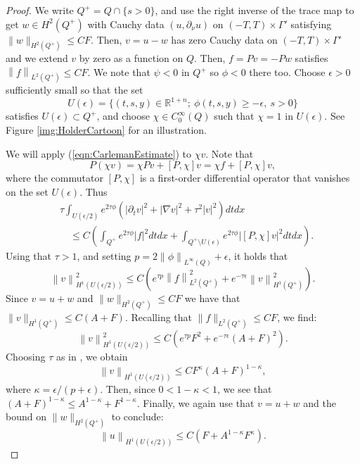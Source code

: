 \documentclass[final,leqno]{siamart1116}
\begin{document}
\begin{proof}
We write $Q^+ = Q \cap \{ s > 0\}$, and use the right inverse of the
trace map to get $w \in H^2(Q^+)$ with Cauchy data $(u, {\partial}_\nu u)$ on
$(-T,T) \times \Gamma'$ satisfying $\|w\|_{H^2(Q^+)} \leq C F$. Then,
$v = u-w$ has zero Cauchy data on $(-T,T) \times \Gamma'$ and we
extend $v$ by zero as a function on $Q$. Then, $f = Pv = -Pw$ satisfies
${\left\|{f} \right\|}_{L^2(Q^+)} \le C F$. We note that $\psi < 0$ in $Q^+$ so $\phi
< 0$ there too. Choose $\epsilon > 0$ sufficiently small so that the
set
\begin{equation*}
  U(\epsilon) = \{(t,s,y) \in {\mathbb{R}}^{1+n};\ \phi(t,s,y) \ge -\epsilon,\ s > 0 \}
\end{equation*}
satisfies $U(\epsilon) \subset Q^+ $, and choose $\chi \in
C_0^\infty(Q)$ such that $\chi = 1$ in $U(\epsilon)$.  See Figure
\ref{img:HolderCartoon} for an illustration.

We will apply (\ref{eqn:CarlemanEstimate}) to $\chi v$. Note that 
\begin{equation*}
  P(\chi v) = \chi Pv + [P,\chi]v = \chi f + [P,\chi]v,
\end{equation*}
where the commutator $[P,\chi]$ is a first-order differential operator
that vanishes on the set $U(\epsilon)$.
Thus
\begin{align*}
  &\tau \int_{U(\epsilon/2)} e^{2 \tau \phi} \left(|{\partial}_t v|^2 + |\nabla v|^2 + \tau^2 |v|^2\right) dt dx \\ 
  &\quad \le C \left(\int_{Q^+} e^{2 \tau \phi} |f|^2 dt dx 
  + \int_{Q^+ \setminus U(\epsilon)} e^{2 \tau\phi} |[P,\chi]v|^2 dt dx\right).
\end{align*}
Using that $\tau > 1$, and setting $p = 2{\left\|{\phi} \right\|}_{L^\infty(Q)} +
\epsilon$, it holds that
\begin{equation*}
  {\left\|{v} \right\|}_{H^1(U(\epsilon / 2))}^2 \le C \left(e^{\tau p}{\left\|{f} \right\|}_{L^2(Q^+)}^2 + e^{-\tau \epsilon}{\left\|{v} \right\|}_{H^1(Q^+)}^2\right).
\end{equation*}
Since $v = u + w$ and $\|w\|_{H^2(Q^+)} \leq CF$ we have that
$\|v\|_{H^1(Q^+)} \leq C(A + F)$. Recalling that $\|f\|_{L^2(Q^+)}
\leq CF$, we find:
\begin{equation*}
  {\left\|{v} \right\|}_{H^1(U(\epsilon / 2))}^2 \le C \left(e^{\tau p}F^2 +
  e^{-\tau \epsilon}(A+F)^2\right).
\end{equation*}
Choosing $\tau$ as in
\cite[Thm. 3.2.2]{Isakov2010}, we obtain
\begin{equation*}
  {\left\|{v} \right\|}_{H^1(U(\epsilon / 2))} \le C F^{\kappa} (A+F)^{1-\kappa},
\end{equation*}
where $\kappa = \epsilon / ( p + \epsilon)$. Then, since $0 < 1 -
\kappa < 1$, we see that $(A+F)^{1-\kappa} \leq A^{1-\kappa} +
F^{1-\kappa}$. Finally, we again use that $v = u + w$ and the bound on
$\|w\|_{H^2(Q^+)}$ to conclude:
\begin{equation*}
  {\left\|{u} \right\|}_{H^1(U(\epsilon/2))} \le C(F +  A^{1-\kappa} F^{\kappa}).
\end{equation*}
\end{proof}
\end{document}
